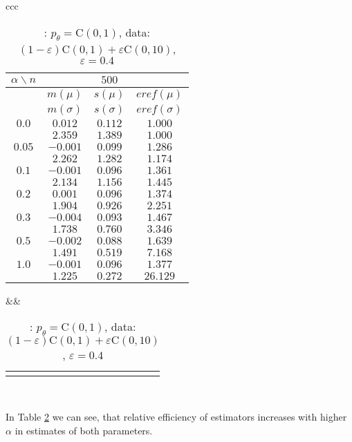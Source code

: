 {\begin{table}[htb] \footnotesize
\begin{center}
\begin{tabular}{ccc}
	\begin{tabular}{|c|ccc|}
	\hline
	$\alpha\backslash n$ && $500$ & \\
	\hline
	& $m(\mu)$ & $s(\mu)$ & $eref(\mu)$ \\
	& $m(\sigma)$ & $s(\sigma)$ & $eref(\sigma)$ \\
	\hline
	$0.0$ & $ 0.012 $ & $ 0.112 $ & $ 1.000 $\\
	 & $ 2.359 $ & $ 1.389 $ & $ 1.000 $\\
	\hline
	$0.05$ & $ -0.001 $ & $ 0.099 $ & $ 1.286 $\\
	 & $ 2.262 $ & $ 1.282 $ & $ 1.174 $\\
	\hline
	$0.1$ & $ -0.001 $ & $ 0.096 $ & $ 1.361 $\\
	 & $ 2.134 $ & $ 1.156 $ & $ 1.445 $\\
	\hline
	$0.2$ & $ 0.001 $ & $ 0.096 $ & $ 1.374 $\\
	 & $ 1.904 $ & $ 0.926 $ & $ 2.251 $\\
	\hline
	$0.3$ & $ -0.004 $ & $ 0.093 $ & $ 1.467 $\\
	 & $ 1.738 $ & $ 0.760 $ & $ 3.346 $\\
	\hline
	$0.5$ & $ -0.002 $ & $ 0.088 $ & $ 1.639 $\\
	 & $ 1.491 $ & $ 0.519 $ & $ 7.168 $\\
	\hline
	$1.0$ & $ -0.001 $ & $ 0.096 $ & $ 1.377 $\\
	 & $ 1.225 $ & $ 0.272 $ & $ 26.129 $\\
	\hline
	\end{tabular}
&&
	\begin{tabular}{c}
		\epsfig{file=Cauchy-e04-eref.eps, height=2.5in}
	\end{tabular}
\\
\end{tabular}
\end{center}
\caption{\R: $p_\theta = \mathrm{C}(0,1)$, data: $(1-\varepsilon)\mathrm{C}(0,1) + \varepsilon \mathrm{C}(0,10)$, $\varepsilon =  0.4$}
\label{tabJK:cauchy-eref}
\end{table}

\noindent In Table \ref{tabJK:cauchy-eref} we can see, that relative efficiency of \R estimators increases with higher $\alpha$ in estimates of both parameters.



}
